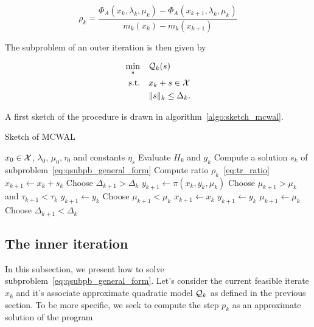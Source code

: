 \documentclass[10pt]{article}
\numberwithin{equation}{section}
\begin{document}
	\begin{equation}\label{eq:tr_ratio}
		\rho_k = \dfrac{\Phi_A(x_{k},\lambda_k,\mu_k)-\Phi_A(x_{k+1},\lambda_k,\mu_k)}{m_k(x_k)-m_k(x_{k+1})}
	\end{equation}
	
	The subproblem of an outer iteration is then given by
	
	\begin{equation}\label{eq:qsubpb_general_form} 
		\begin{aligned}
			\min_{s} \quad& {\mathcal{Q}}_k(s)  \\
			\text{s.t.}  \quad &  x_k+s \in {\mathcal{X}} \\
			& \|s\|_k \le \Delta_k.
		\end{aligned}	
	\end{equation}
	
	A first sketch of the procedure is drawn in algorithm~\ref{algo:sketch_mcwal}.
	 \begin{algorithm}
	 	\caption{Sketch of MCWAL}\label{algo:sketch_mcwal}
	 	\begin{algorithmic}
	 		\Require $x_0\in {\mathcal{X}}$, $\lambda_0$, $\mu_0, \tau_0$ and constants $\eta_s$
	 		\State Evaluate $H_k$ and $g_k$ 
	 		\State Compute a solution $s_k$ of subproblem~\eqref{eq:qsubpb_general_form} 
	 		\State Compute ratio $\rho_k$~\eqref{eq:tr_ratio}
	 		 
	 		\State $x_{k+1} \gets x_k+s_k$
	 		\State Choose $\Delta_{k+1} > \Delta_k$
	 		\State $y_{k+1} \gets \pi(x_k,y_k,\mu_k)$
	 		\State Choose $\mu_{k+1} > \mu_k$ and $\tau_{k+1} < \tau_k$
	 		\Else
	 		\State $y_{k+1} \gets y_k$
	 		\State Choose $\mu_{k+1} < \mu_k$
	 		\EndIf
	 		\Else {}
	 		\State  $x_{k+1} \gets x_k$
	 		\State  $y_{k+1} \gets y_k$
	 		\State  $\mu_{k+1} \gets \mu_k$
	 		\State Choose $\Delta_{k+1} < \Delta_k$
	 		\EndIf
	 		\EndWhile
	 	\end{algorithmic}
	 \end{algorithm}
	 
	 \subsection{The inner iteration}
	 
	 In this subsection, we present how to solve subproblem~\eqref{eq:qsubpb_general_form}. Let's consider the current feasible iterate $x_k$ and it's associate approximate quadratic model ${\mathcal{Q}}_k$ as defined in the previous section. To be more specific, we seek to compute the step $p_k$ as an approximate solution of the program
	 
\end{document}
